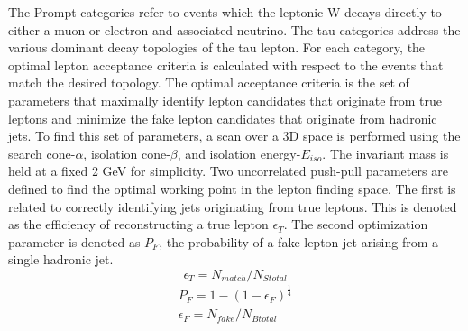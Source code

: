 The Prompt categories refer to events which the leptonic W decays directly to either a muon or electron and associated neutrino. The tau categories address the various dominant decay topologies of the tau lepton. For each category, the optimal lepton acceptance criteria is calculated with respect to the events that match the desired topology. The optimal acceptance criteria is the set of parameters that maximally identify lepton candidates that originate from true leptons and minimize the fake lepton candidates that originate from hadronic jets. To find this set of parameters, a scan over a 3D space is performed using the search cone-$\alpha$, isolation cone-$\beta$, and isolation energy-$E_{iso}$. The invariant mass is held at a fixed 2 GeV for simplicity.
Two uncorrelated push-pull parameters are defined to find the optimal working point in the lepton finding space. The first is related to correctly identifying jets originating from true leptons. This is denoted as the efficiency of reconstructing a true lepton $\epsilon_T$. The second optimization parameter is denoted as $P_F$, the probability of a fake lepton jet arising from a single hadronic jet.  
\begin{equation}
\label{eq:et}
\epsilon_T = N_{match}/N_{Stotal}
\end{equation}
\begin{equation}
\begin{split}
\label{eq:pf}
P_F = 1-(1-\epsilon_F)^{\frac{1}{4}} \\
\epsilon_F = N_{fake}/N_{Btotal}
\end{split}
\end{equation}
